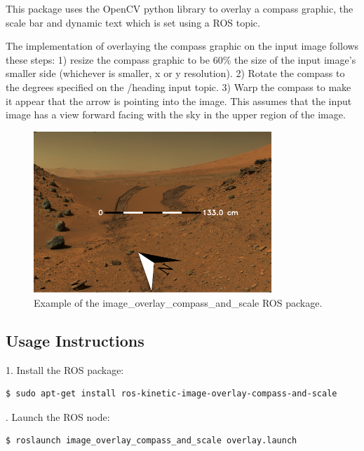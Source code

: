 \documentclass[runningheads,a4paper]{llncs}
\begin{document}
This package uses the OpenCV\cite{opencv_library} python library to overlay a compass graphic, the scale bar and dynamic text which is set using a ROS topic.

The implementation of overlaying the compass graphic on the input image follows these steps: 1) resize the compass graphic to be 60\% the size of the input image's smaller side (whichever is smaller, x or y resolution). 2) Rotate the compass to the degrees specified on the /heading input topic. 3) Warp the compass to make it appear that the arrow is pointing into the image. This assumes that the input image has a view forward facing with the sky in the upper region of the image.

\begin{figure}
\centering
\includegraphics[width=0.8\textwidth]{overlay1}
\caption{Example of the image\_overlay\_compass\_and\_scale ROS package.}
\label{fig:overlay1}
\end{figure}

\subsection{Usage Instructions}

1. Install the ROS package:

\begin{lstlisting}[frame=single,basicstyle=\ttfamily\footnotesize,breaklines=true]
$ sudo apt-get install ros-kinetic-image-overlay-compass-and-scale
\end{lstlisting}

. Launch the ROS node:

\begin{lstlisting}[frame=single,basicstyle=\ttfamily\footnotesize,breaklines=true]
$ roslaunch image_overlay_compass_and_scale overlay.launch
\end{lstlisting}
\end{document}
